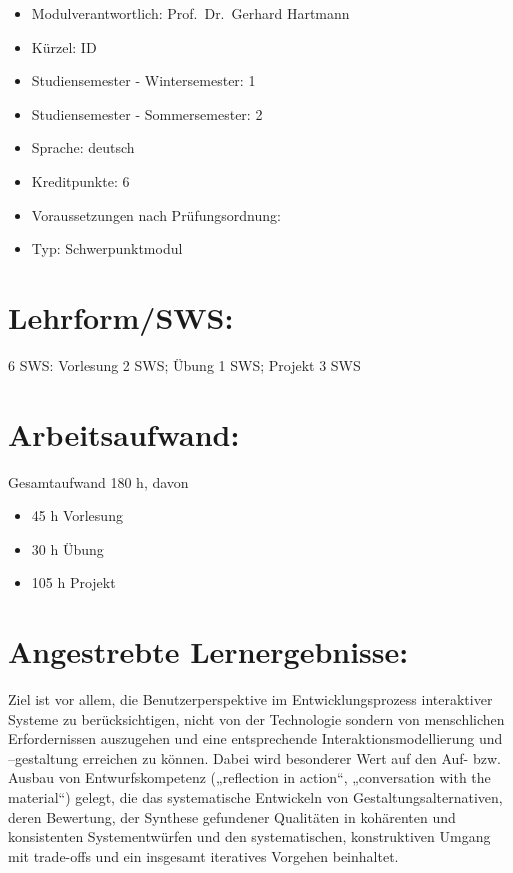 \begin{itemize}
\tightlist
\item
  Modulverantwortlich: Prof.~Dr.~Gerhard Hartmann
\item
  Kürzel: ID
\item
  Studiensemester - Wintersemester: 1
\item
  Studiensemester - Sommersemester: 2
\item
  Sprache: deutsch
\item
  Kreditpunkte: 6
\item
  Voraussetzungen nach Prüfungsordnung:
\item
  Typ: Schwerpunktmodul
\end{itemize}

\section*{Lehrform/SWS:}\label{lehrformsws-5}

6 SWS: Vorlesung 2 SWS; Übung 1 SWS; Projekt 3 SWS

\section*{Arbeitsaufwand:}\label{arbeitsaufwand-11}

Gesamtaufwand 180 h, davon

\begin{itemize}
\item
  45 h Vorlesung
\item
  30 h Übung
\item
  105 h Projekt
\end{itemize}

\section*{Angestrebte
Lernergebnisse:}\label{angestrebte-lernergebnisse-5}

Ziel ist vor allem, die Benutzerperspektive im Entwicklungsprozess
interaktiver Systeme zu berücksichtigen, nicht von der Technologie
sondern von menschlichen Erfordernissen auszugehen und eine
entsprechende Interaktionsmodellierung und --gestaltung erreichen zu
können. Dabei wird besonderer Wert auf den Auf- bzw. Ausbau von
Entwurfskompetenz („reflection in action``, „conversation with the
material``) gelegt, die das systematische Entwickeln von
Gestaltungsalternativen, deren Bewertung, der Synthese gefundener
Qualitäten in kohärenten und konsistenten Systementwürfen und den
systematischen, konstruktiven Umgang mit trade-offs und ein insgesamt
iteratives Vorgehen beinhaltet.

